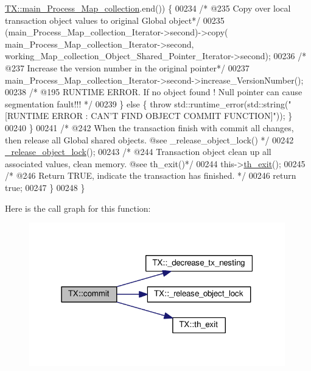 \begin{DoxyCode}
      \hyperlink{class_t_x_a1a45d726894190695314464d7cd97c29_a1a45d726894190695314464d7cd97c29}{TX::main\_Process\_Map\_collection}.end()) \{
00234                     \textcolor{comment}{/* @235 Copy over local transaction object values to original Global object*/}
00235                     (main\_Process\_Map\_collection\_Iterator->second)->copy(
      main\_Process\_Map\_collection\_Iterator->second, working\_Map\_collection\_Object\_Shared\_Pointer\_Iterator->second);
00236                     \textcolor{comment}{/* @237 Increase the version number in the original pointer*/}
00237                     main\_Process\_Map\_collection\_Iterator->second->increase\_VersionNumber();
00238                 \textcolor{comment}{/* @195 RUNTIME ERROR. If no object found ! Null pointer can cause segmentation fault!!! */}
00239                 \} \textcolor{keywordflow}{else} \{ \textcolor{keywordflow}{throw} std::runtime\_error(std::string(\textcolor{stringliteral}{"[RUNTIME ERROR : CAN'T FIND OBJECT COMMIT
       FUNCTION]"})); \}
00240         \}
00241         \textcolor{comment}{/* @242 When the transaction finish with commit all changes, then release all Global shared
       objects. @see \_release\_object\_lock() */}
00242         \hyperlink{class_t_x_a4c13d2015dc15d0f788fa9a1413f0463_a4c13d2015dc15d0f788fa9a1413f0463}{\_release\_object\_lock}();
00243         \textcolor{comment}{/* @244 Transaction object clean up all associated values, clean memory. @see th\_exit()*/}
00244         this->\hyperlink{class_t_x_ae045534c4a9d39bd5c6ea2a39a372a79_ae045534c4a9d39bd5c6ea2a39a372a79}{th\_exit}();
00245         \textcolor{comment}{/* @246 Return TRUE, indicate the transaction has finished. */}
00246         \textcolor{keywordflow}{return} \textcolor{keyword}{true};
00247     \}
00248 \}
\end{DoxyCode}


Here is the call graph for this function\+:\nopagebreak
\begin{figure}[H]
\begin{center}
\leavevmode
\includegraphics[width=315pt]{class_t_x_a9dde5d356b35e557448e58d260087356_a9dde5d356b35e557448e58d260087356_cgraph}
\end{center}
\end{figure}


